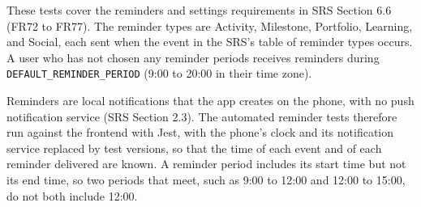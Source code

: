 \documentclass[12pt, titlepage]{article}
\begin{document}
These tests cover the reminders and settings requirements in SRS Section 6.6
(FR72 to FR77). The reminder types are Activity, Milestone, Portfolio,
Learning, and Social, each sent when the event in the SRS's table of reminder
types occurs. A user who has not chosen any reminder periods receives
reminders during \texttt{DEFAULT\_REMINDER\_PERIOD} (9:00 to 20:00 in their
time zone).

Reminders are local notifications that the app creates on the phone, with no
push notification service (SRS Section 2.3). The automated reminder tests
therefore run against the frontend with Jest, with the phone's clock and its
notification service replaced by test versions, so that the time of each
event and of each reminder delivered are known. A reminder period includes
its start time but not its end time, so two periods that meet, such as 9:00
to 12:00 and 12:00 to 15:00, do not both include 12:00.
\end{document}
